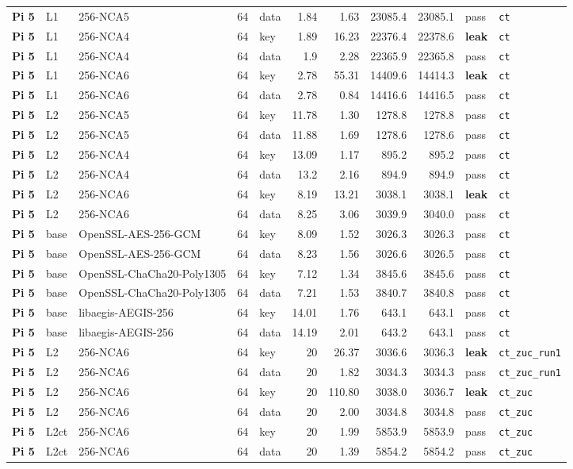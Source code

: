 {\begin{longtable}{@{}>{\bfseries}l l l r l r r r r l l@{}}
Pi 5 & L1 & 256-NCA5 & 64 & data & 1.84 & 1.63 & 23085.4 & 23085.1 & pass & \texttt{ct} \\
Pi 5 & L1 & 256-NCA4 & 64 & key & 1.89 & 16.23 & 22376.4 & 22378.6 & \textbf{leak} & \texttt{ct} \\
Pi 5 & L1 & 256-NCA4 & 64 & data & 1.9 & 2.28 & 22365.9 & 22365.8 & pass & \texttt{ct} \\
Pi 5 & L1 & 256-NCA6 & 64 & key & 2.78 & 55.31 & 14409.6 & 14414.3 & \textbf{leak} & \texttt{ct} \\
Pi 5 & L1 & 256-NCA6 & 64 & data & 2.78 & 0.84 & 14416.6 & 14416.5 & pass & \texttt{ct} \\
Pi 5 & L2 & 256-NCA5 & 64 & key & 11.78 & 1.30 & 1278.8 & 1278.8 & pass & \texttt{ct} \\
Pi 5 & L2 & 256-NCA5 & 64 & data & 11.88 & 1.69 & 1278.6 & 1278.6 & pass & \texttt{ct} \\
Pi 5 & L2 & 256-NCA4 & 64 & key & 13.09 & 1.17 & 895.2 & 895.2 & pass & \texttt{ct} \\
Pi 5 & L2 & 256-NCA4 & 64 & data & 13.2 & 2.16 & 894.9 & 894.9 & pass & \texttt{ct} \\
Pi 5 & L2 & 256-NCA6 & 64 & key & 8.19 & 13.21 & 3038.1 & 3038.1 & \textbf{leak} & \texttt{ct} \\
Pi 5 & L2 & 256-NCA6 & 64 & data & 8.25 & 3.06 & 3039.9 & 3040.0 & pass & \texttt{ct} \\
Pi 5 & base & OpenSSL-AES-256-GCM & 64 & key & 8.09 & 1.52 & 3026.3 & 3026.3 & pass & \texttt{ct} \\
Pi 5 & base & OpenSSL-AES-256-GCM & 64 & data & 8.23 & 1.56 & 3026.6 & 3026.5 & pass & \texttt{ct} \\
Pi 5 & base & OpenSSL-ChaCha20-Poly1305 & 64 & key & 7.12 & 1.34 & 3845.6 & 3845.6 & pass & \texttt{ct} \\
Pi 5 & base & OpenSSL-ChaCha20-Poly1305 & 64 & data & 7.21 & 1.53 & 3840.7 & 3840.8 & pass & \texttt{ct} \\
Pi 5 & base & libaegis-AEGIS-256 & 64 & key & 14.01 & 1.76 & 643.1 & 643.1 & pass & \texttt{ct} \\
Pi 5 & base & libaegis-AEGIS-256 & 64 & data & 14.19 & 2.01 & 643.2 & 643.1 & pass & \texttt{ct} \\
\midrule
Pi 5 & L2 & 256-NCA6 & 64 & key & 20 & 26.37 & 3036.6 & 3036.3 & \textbf{leak} & \texttt{ct\_zuc\_run1} \\
Pi 5 & L2 & 256-NCA6 & 64 & data & 20 & 1.82 & 3034.3 & 3034.3 & pass & \texttt{ct\_zuc\_run1} \\
\midrule
Pi 5 & L2 & 256-NCA6 & 64 & key & 20 & 110.80 & 3038.0 & 3036.7 & \textbf{leak} & \texttt{ct\_zuc} \\
Pi 5 & L2 & 256-NCA6 & 64 & data & 20 & 2.00 & 3034.8 & 3034.8 & pass & \texttt{ct\_zuc} \\
Pi 5 & L2ct & 256-NCA6 & 64 & key & 20 & 1.99 & 5853.9 & 5853.9 & pass & \texttt{ct\_zuc} \\
Pi 5 & L2ct & 256-NCA6 & 64 & data & 20 & 1.39 & 5854.2 & 5854.2 & pass & \texttt{ct\_zuc} \\
\bottomrule
\end{longtable}}
